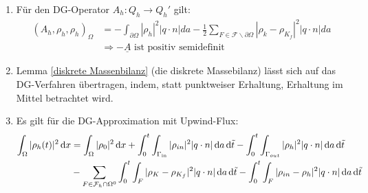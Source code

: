 \begin{remark}
	\begin{enumerate} 
		\item Für den DG-Operator $A_h: Q_h \rightarrow Q_h'$ gilt: 	\newline
		\begin{align*}
			(A_h,\rho_h,\rho_h)_{\Omega} &= - \int_{\partial 	\Omega} | \rho_h | ^2 | q \cdot n | da - \frac{1}{2} \sum_{F 	\in \mathcal{F} \backslash \partial \Omega} | \rho_k - 	\rho_{K_f} |^2 |q \cdot n| da \\
			&\Rightarrow - \underline{A} \text{ ist positiv 	semidefinit}
		\end{align*}
		\item Lemma \ref{diskrete Massenbilanz} (die diskrete Massebilanz) lässt sich auf das DG-Verfahren übertragen, indem, statt punktweiser Erhaltung, Erhaltung im Mittel betrachtet wird.
		\item Es gilt für die DG-Approximation mit Upwind-Flux: \newline
		\begin{align*}
			\int_{\Omega} | \rho_h (t) | ^2 \diff x &= \int_{\Omega} |\rho_0 |^2 \diff x 
			+ \int_0^t \int_{\Gammain} | \rho_{in} |^2 |q \cdot n | \diff a \diff \tilde{t}
			- \int_0^t \int_{\Gamma_{out}} |\rho_h |^2 |q \cdot n | \diff a \diff \tilde{t} \\
			&- \sum_{F \in \mathcal{F}_h \cap \Omega^0} \int_0^t \int_F | \rho_K - \rho_{K_f} |^2 |q \cdot n| \diff a \diff \tilde{t}
			- \int_0^t \int_F |\rho_{in} - \rho_h |^2 |q \cdot n| \diff a \diff \tilde{t}
		\end{align*}
	\end{enumerate}
\end{remark}
